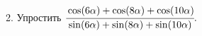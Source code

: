 2. Упростить $\cfrac{\cos(6\alpha)+\cos(8\alpha)+\cos(10\alpha)}{\sin(6\alpha)+\sin(8\alpha)+\sin(10\alpha)}.$\\
